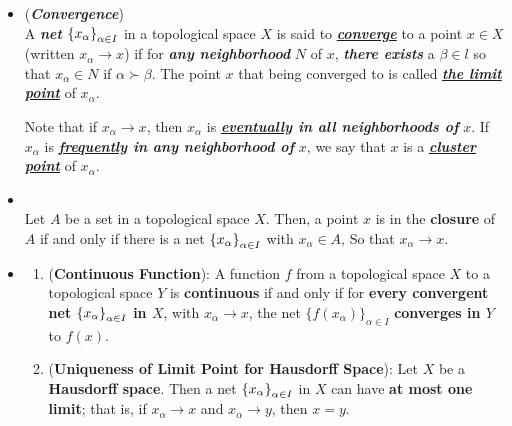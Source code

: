 \documentclass[11pt]{article}
\begin{document}
\begin{itemize}
\item \begin{definition} (\emph{\textbf{Convergence}})\\
A \emph{\textbf{net}} $\left\{x_\alpha\right\}_{\alpha \in I}$  in a topological space $X$ is said to \underline{\emph{\textbf{converge}}} to a point $x \in X$ (written $x_{\alpha} \rightarrow x$) if for \textbf{\emph{any neighborhood}} $N$ of $x$, \emph{\textbf{there exists}} a $\beta \in l$ so that $x_{\alpha} \in N$ if $\alpha \succ \beta$. The point $x$ that being converged to is called \underline{\emph{\textbf{the limit point}}} of  $x_{\alpha}$.

Note that if $x_\alpha \rightarrow x$, then $x_{\alpha}$ is \emph{\textbf{\underline{eventually} in all neighborhoods of}} $x$. If $x_{\alpha}$ is \emph{\textbf{\underline{frequently} in any neighborhood of}} $x$, we say that $x$ is a \underline{\emph{\textbf{cluster point}}} of $x_{\alpha}$. 
\end{definition}

\item \begin{proposition} \citep{reed1980methods}\\
Let $A$ be a set in a topological space $X$. Then, a point $x$ is in the \textbf{closure} of $A$ if and only if there is a net $\left\{x_\alpha\right\}_{\alpha \in I}$ with $x_{\alpha} \in A$, So that $x_{\alpha} \rightarrow x$.
\end{proposition}

\item \begin{proposition} \citep{reed1980methods}
\begin{enumerate}
\item (\textbf{Continuous Function}): A function $f$ from a topological space $X$ to a topological space $Y$ is \textbf{continuous} if and only if for \textbf{every convergent net} $\left\{x_\alpha\right\}_{\alpha \in I}$ \textbf{in $X$}, with $x_{\alpha} \rightarrow x$, the net $\{f(x_{\alpha})\}_{\alpha \in I}$ \textbf{converges in $Y$} to $f(x)$.
\item (\textbf{Uniqueness of Limit Point for Hausdorff Space}): Let $X$ be a \textbf{Hausdorff space}. Then a net $\left\{x_\alpha\right\}_{\alpha \in I}$ in $X$ can have \textbf{at most one limit}; that is, if $x_{\alpha} \rightarrow x$ and $x_{\alpha} \rightarrow y$, then $x = y$.
\end{enumerate}
\end{proposition}


\end{itemize}
\end{document}
